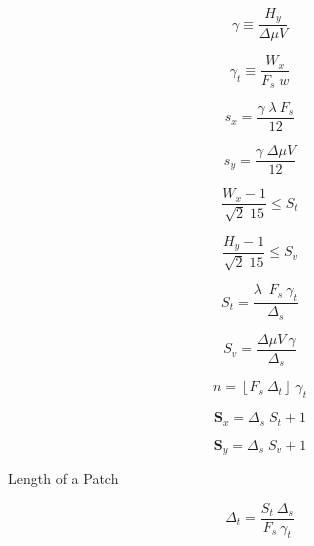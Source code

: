 \begin{equation}
\gamma \equiv \frac{H_y}{\Delta \mu V}  
\label{eq:gammadefinition}
\end{equation}

\begin{equation}
\gamma_t \equiv \frac{W_x}{F_s \; w}  
\label{eq:gammatdefinition}
\end{equation}

\begin{equation}
s_x = \frac{ \gamma \;  \lambda \  F_s}{12}
\label{eq:mapping2}
\end{equation}

\begin{equation}
s_y= \frac{\gamma \; \Delta \mu V}{12} 
\label{eq:mapping1}
\end{equation}


\begin{equation}
\frac{W_x-1}{\sqrt{2} \; 15}  \leq S_t 
\label{eq:restriction1}
\end{equation}

\begin{equation}
\frac{H_y-1}{\sqrt{2} \; 15}  \leq S_v 
\label{eq:restriction2}
\end{equation}

\begin{equation}
S_t = \frac{ \lambda \;  \  F_s \ \gamma_t }{\Delta_s}
\label{eq:mapping2}
\end{equation}

\begin{equation}
S_v= \frac{\Delta \mu V \ \gamma}{\Delta_s} 
\label{eq:mapping1}
\end{equation}



\begin{equation}
n = \left\lfloor F_s \ \Delta_t \right\rfloor \ \gamma_t
\label{eq:mapping1}
\end{equation}



\begin{equation}
\mathbf{S}_x = \Delta_s \; S_t + 1
\label{eq:mapping2}
\end{equation}

\begin{equation}
\mathbf{S}_y = \Delta_s \; S_v + 1
\label{eq:mapping1}
\end{equation}


Length of a Patch

\begin{equation}
\Delta_t = \frac{S_t \ \Delta_s}{F_s \ \gamma_t} 
\label{eq:mapping1}
\end{equation}

